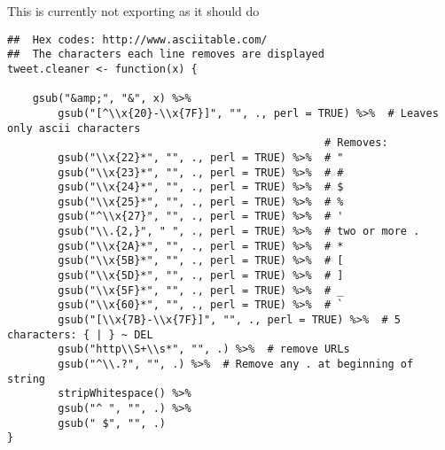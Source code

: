 \documentclass{article}
\begin{document}
This is currently not exporting as it should do

\vspace{10mm}

\begin{lstlisting}
##  Hex codes: http://www.asciitable.com/
##  The characters each line removes are displayed
tweet.cleaner <- function(x) {

    gsub("&amp;", "&", x) %>%
        gsub("[^\\x{20}-\\x{7F}]", "", ., perl = TRUE) %>%  # Leaves only ascii characters
                                                  # Removes:
        gsub("\\x{22}*", "", ., perl = TRUE) %>%  # "        
        gsub("\\x{23}*", "", ., perl = TRUE) %>%  # #           
        gsub("\\x{24}*", "", ., perl = TRUE) %>%  # $
        gsub("\\x{25}*", "", ., perl = TRUE) %>%  # %
        gsub("^\\x{27}", "", ., perl = TRUE) %>%  # '                
        gsub("\\.{2,}", " ", ., perl = TRUE) %>%  # two or more .
        gsub("\\x{2A}*", "", ., perl = TRUE) %>%  # *
        gsub("\\x{5B}*", "", ., perl = TRUE) %>%  # [
        gsub("\\x{5D}*", "", ., perl = TRUE) %>%  # ]
        gsub("\\x{5F}*", "", ., perl = TRUE) %>%  # _
        gsub("\\x{60}*", "", ., perl = TRUE) %>%  # `
        gsub("[\\x{7B}-\\x{7F}]", "", ., perl = TRUE) %>%  # 5 characters: { | } ~ DEL
        gsub("http\\S+\\s*", "", .) %>%  # remove URLs
        gsub("^\\.?", "", .) %>%  # Remove any . at beginning of string
        stripWhitespace() %>%
        gsub("^ ", "", .) %>%
        gsub(" $", "", .)
}
\end{lstlisting}
\end{document}
